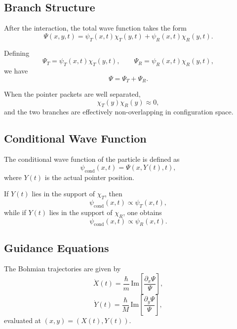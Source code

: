 {\subsection{Branch Structure}

After the interaction, the total wave function takes the form
\begin{equation}
\Psi(x,y,t) =
\psi_T(x,t)\chi_T(y,t)
+
\psi_R(x,t)\chi_R(y,t).
\end{equation}

Defining
\begin{equation}
\Psi_T = \psi_T(x,t)\chi_T(y,t), \qquad
\Psi_R = \psi_R(x,t)\chi_R(y,t),
\end{equation}
we have
\begin{equation}
\Psi = \Psi_T + \Psi_R.
\end{equation}

When the pointer packets are well separated,
\begin{equation}
\chi_T(y)\chi_R(y) \approx 0,
\end{equation}
and the two branches are effectively non-overlapping in configuration space.

\subsection{Conditional Wave Function}

The conditional wave function of the particle is defined as
\begin{equation}
\psi_{\text{cond}}(x,t) = \Psi(x, Y(t), t),
\end{equation}
where $Y(t)$ is the actual pointer position.

If $Y(t)$ lies in the support of $\chi_T$, then
\begin{equation}
\psi_{\text{cond}}(x,t) \propto \psi_T(x,t),
\end{equation}
while if $Y(t)$ lies in the support of $\chi_R$, one obtains
\begin{equation}
\psi_{\text{cond}}(x,t) \propto \psi_R(x,t).
\end{equation}

\subsection{Guidance Equations}

The Bohmian trajectories are given by
\begin{equation}
\dot X(t) = \frac{\hbar}{m}\,\mathrm{Im}\left[\frac{\partial_x \Psi}{\Psi}\right],
\end{equation}
\begin{equation}
\dot Y(t) = \frac{\hbar}{M}\,\mathrm{Im}\left[\frac{\partial_y \Psi}{\Psi}\right],
\end{equation}
evaluated at $(x,y) = (X(t),Y(t))$.

}
